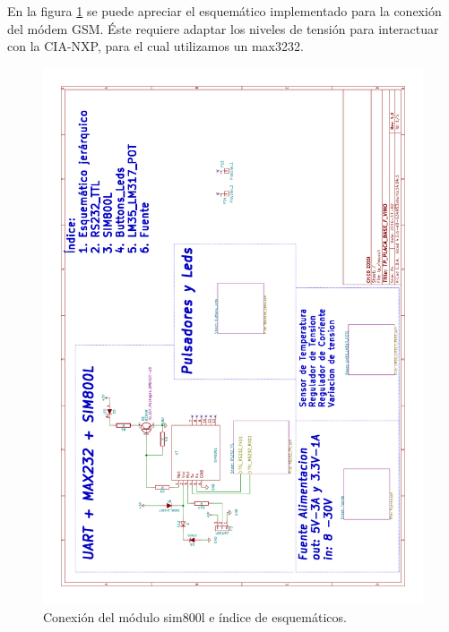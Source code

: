 En la figura \ref{fig:essim800} se puede apreciar el esquemático implementado para la conexión del módem GSM. Éste requiere adaptar los niveles de tensión para interactuar con la CIA-NXP, para el cual utilizamos un max3232.
\begin{figure}[h]
  \centering
  \includegraphics[page=1,scale=0.3,angle=270]{./Figures/schematic.pdf}
  \caption{Conexión del módulo sim800l e índice de esquemáticos.}
  \label{fig:essim800}
\end{figure}

